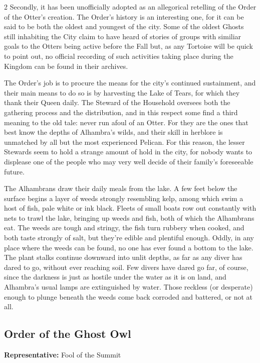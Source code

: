 \begin{multicols}{2}
Secondly, it has been unofficially adopted as an allegorical retelling of the Order of the Otter's creation. The Order's history is an interesting one, for it can be said to be both the oldest and youngest of the city. Some of the oldest Ghosts still inhabiting the City claim to have heard of stories of groups with similiar goals to the Otters being active before the Fall but, as any Tortoise will be quick to point out, no official recording of such activities taking place during the Kingdom can be found in their archives.

The Order's job is to procure the means for the city's continued sustainment, and their main means to do so is by harvesting the Lake of Tears, for which they thank their Queen daily. The Steward of the Household oversees both the gathering process and the distribution, and in this respect some find a third meaning to the old tale: never run afoul of an Otter. For they are the ones that best know the depths of Alhambra's wilds, and their skill in herblore is unmatched by all but the most experienced Pelican. For this reason, the lesser Stewards seem to hold a strange amount of hold in the city, for nobody wants to displease one of the people who may very well decide of their family's foreseeable future.

The Alhambrans draw their daily meals from the lake. A few feet below the surface begins a layer of weeds strongly resembling kelp, among which swim a host of fish, pale white or ink black. Fleets of small boats row out constantly with nets to trawl the lake, bringing up weeds and fish, both of which the Alhambrans eat. The weeds are tough and stringy, the fish turn rubbery when cooked, and both taste strongly of salt, but they're edible and plentiful enough. Oddly, in any place where the weeds can be found, no one has ever found a bottom to the lake. The plant stalks continue downward into unlit depths, as far as any diver has dared to go, without ever reaching soil. Few divers have dared go far, of course, since the darkness is just as hostile under the water as it is on land, and Alhambra's usual lamps are extinguished by water. Those reckless (or desperate) enough to plunge beneath the weeds come back corroded and battered, or not at all. 

\subsection*{Order of the Ghost Owl}

\textbf{Representative:} Fool of the Summit\\


\end{multicols}
